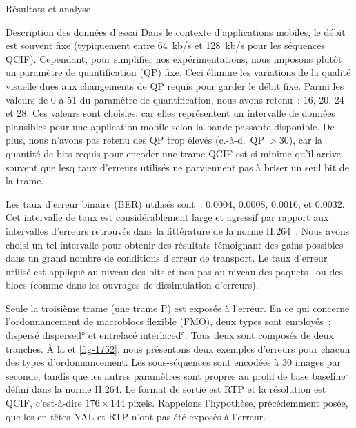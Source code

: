 \begin{chapter}{Résultats et analyse}
\begin{section}{Description des données d'essai}
Dans le contexte d'applications mobiles, le débit est souvent fixe (typiquement
entre 64~kb/s et 128~kb/s pour les séquences QCIF). Cependant, pour simplifier
nos expérimentations, nous imposons plutôt un paramètre de quantification (QP)
fixe. Ceci élimine les variations de la qualité visuelle dues aux changements de
QP requis pour garder le débit fixe. Parmi les valeurs de 0 à 51 du paramètre de
quantification, nous avons retenu~: 16, 20, 24 et 28. Ces valeurs sont choisies,
car elles représentent un intervalle de données plausibles pour une application
mobile selon la bande passante disponible. De plus, nous n'avons pas retenu des
QP trop élevés (c.-à-d.~QP$~>30$), car la quantité de bits requis pour encoder
une trame QCIF est si minime qu’il arrive souvent que lesq taux d’erreurs
utilisés ne parviennent pas à briser un seul bit de la trame.

Les taux d'erreur binaire (BER) utilisés sont~: 0.0004, 0.0008, 0.0016, et
0.0032. Cet intervalle de taux est considérablement large et agressif par
rapport aux intervalles d'erreurs retrouvés dans la littérature de la norme
H.264~\citep{Stockhammer2003}. Nous avons choisi un tel intervalle pour obtenir
des résultats témoignant des gains possibles dans un grand nombre de conditions
d'erreur de transport. Le taux d'erreur utilisé est appliqué au niveau des bits
et non pas au niveau des paquets~\citep{Wenger2003} ou des blocs (comme dans les
ouvrages de dissimulation d'erreurs).

Seule la troisième trame (une trame P) est exposée à l'erreur. En ce qui
concerne l'ordonnancement de macroblocs flexible (FMO), deux types sont
employés~: dispersé \ang{dispersed} et entrelacé \ang{interlaced}. Tous deux
sont composés de deux tranches. À la  et \ref{fig-1752}, nous
présentons deux exemples d'erreurs pour chacun des types d'ordonnancement. Les
sous-séquences sont encodées à 30 images par seconde, tandis que les autres
paramètres sont propres au profil de base \ang{baseline} défini dans la norme
H.264. Le format de sortie est RTP et la résolution est QCIF, c'est-à-dire
$176\times 144$ pixels. Rappelons l'hypothèse, précédemment posée, que les
en-têtes NAL et RTP n'ont pas été exposés à l'erreur.


\end{section}
\end{chapter}
